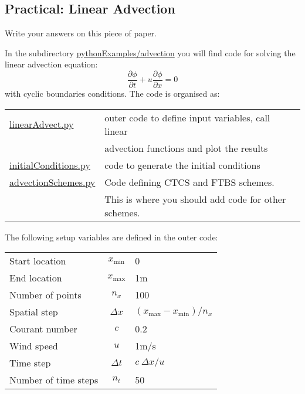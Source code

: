 \subsection{Practical: Linear Advection}

Write your answers on this piece of paper.

In the subdirectory \url{pythonExamples/advection} you will find code for solving the linear advection equation:
\begin{equation*}
\frac{\partial\phi}{\partial t} + u\frac{\partial\phi}{\partial x} = 0
\end{equation*}
with cyclic boundaries conditions. The code is organised as:\\
\begin{tabular}{ll}
\url{linearAdvect.py} & outer code to define input variables, call linear\\
                      & advection functions and plot the results \\
\url{initialConditions.py} & code to generate the initial conditions \\
\url{advectionSchemes.py} & Code defining CTCS and FTBS schemes. \\
                          & This is where you should add code for other schemes.
\end{tabular}

The following setup variables are defined in the outer code:\\
\begin{tabular}{lcl}
Start location & $x_{\min}$ & 0\\
End location & $x_{\max}$ & 1m\\
Number of points & $n_x$ & 100\\
Spatial step & $\Delta x$ & $(x_{\max} - x_{\min})/n_x$ \\
Courant number & $c$ & 0.2 \\
Wind speed & $u$ & 1m/s\\
Time step & $\Delta t$ & $c ~ \Delta x/u$ \\
Number of time steps & $n_t$ & 50\\
\end{tabular}

